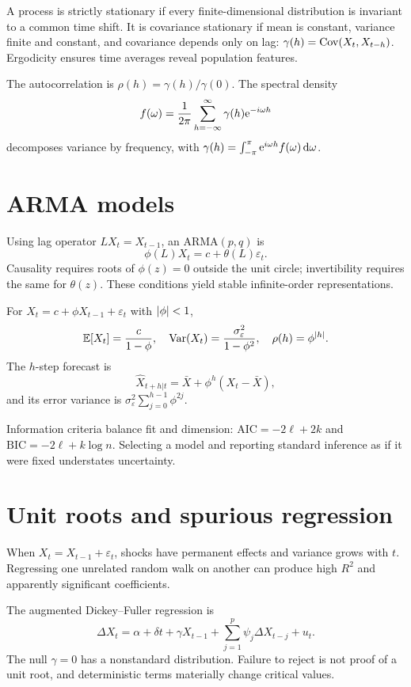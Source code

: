 A process is strictly stationary if every finite-dimensional distribution is
invariant to a common time shift. It is covariance stationary if mean is constant,
variance finite and constant, and covariance depends only on lag:
$\gamma(h)=\operatorname{Cov}(X_t,X_{t-h})$. Ergodicity ensures time averages reveal population
features.

The autocorrelation is $\rho(h)=\gamma(h)/\gamma(0)$. The spectral density
\[
f(\omega)=\frac{1}{2\pi}\sum_{h=-\infty}^{\infty}
\gamma(h)\mathrm e^{-i\omega h}
\]
decomposes variance by frequency, with
$\gamma(h)=\int_{-\pi}^{\pi}\mathrm e^{i\omega h}f(\omega)\,\mathrm d\omega$.

\section{ARMA models}

Using lag operator $L X_t=X_{t-1}$, an ARMA$(p,q)$ is
\[
\phi(L)X_t=c+\theta(L)\varepsilon_t.
\]
Causality requires roots of $\phi(z)=0$ outside the unit circle; invertibility
requires the same for $\theta(z)$. These conditions yield stable infinite-order
representations.

\begin{example}[AR(1)]
For $X_t=c+\phi X_{t-1}+\varepsilon_t$ with $\left|\phi\right|<1$,
\[
\operatorname{\mathbb E}[X_t]=\frac{c}{1-\phi},\quad
\operatorname{Var}(X_t)=\frac{\sigma_\varepsilon^2}{1-\phi^2},\quad
\rho(h)=\phi^{\left|h\right|}.
\]
The $h$-step forecast is
\[
\widehat X_{t+h|t}
=\bar X+\phi^h(X_t-\bar X),
\]
and its error variance is
$\sigma_\varepsilon^2\sum_{j=0}^{h-1}\phi^{2j}$.
\end{example}

Information criteria balance fit and dimension:
$\mathrm{AIC}=-2\ell+2k$ and
$\mathrm{BIC}=-2\ell+k\log n$. Selecting a model and reporting standard inference as
if it were fixed understates uncertainty.

\section{Unit roots and spurious regression}

When $X_t=X_{t-1}+\varepsilon_t$, shocks have permanent effects and variance grows
with $t$. Regressing one unrelated random walk on another can produce high $R^2$ and
apparently significant coefficients.

The augmented Dickey--Fuller regression is
\[
\Delta X_t=\alpha+\delta t+\gamma X_{t-1}
+\sum_{j=1}^p\psi_j\Delta X_{t-j}+u_t.
\]
The null $\gamma=0$ has a nonstandard distribution. Failure to reject is not proof
of a unit root, and deterministic terms materially change critical values.

